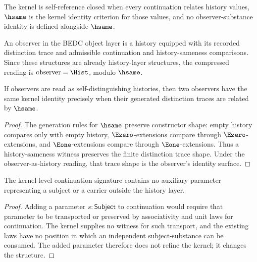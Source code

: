 \begin{definition}
\label{def:philosophy-self-reference-closure}
The kernel is self-reference closed when every continuation relates
history values, \(\hsame\) is the kernel identity criterion for those
values, and no observer-substance identity is defined alongside
\(\hsame\).
\end{definition}

\begin{definition}[Observer]
\label{def:philosophy-observer}
An observer in the BEDC object layer is a history equipped with its
recorded distinction trace and admissible continuation and
history-sameness comparisons. Since these structures are already
history-layer structures, the compressed reading is
\(\text{observer}=\Hist\), modulo \(\hsame\).
\end{definition}

\begin{theorem}
\label{thm:philosophy-hsame-observer-identity}
If observers are read as self-distinguishing histories, then two
observers have the same kernel identity precisely when their generated
distinction traces are related by \(\hsame\).
\end{theorem}
\begin{proof}
The generation rules for \(\hsame\) preserve constructor shape: empty
history compares only with empty history, \(\Ezero\)-extensions compare
through \(\Ezero\)-extensions, and \(\Eone\)-extensions compare through
\(\Eone\)-extensions. Thus a history-sameness witness preserves the
finite distinction trace shape. Under the observer-as-history reading,
that trace shape is the observer's identity surface.
\end{proof}

\begin{theorem}
\label{thm:philosophy-no-subject-parameter}
The kernel-level continuation signature contains no auxiliary parameter
representing a subject or a carrier outside the history layer.
\end{theorem}
\begin{proof}
Adding a parameter \(s:\mathsf{Subject}\) to continuation would require
that parameter to be transported or preserved by associativity and unit
laws for continuation. The kernel supplies no witness for such
transport, and the existing laws have no position in which an
independent subject-substance can be consumed. The added parameter
therefore does not refine the kernel; it changes the structure.
\end{proof}

